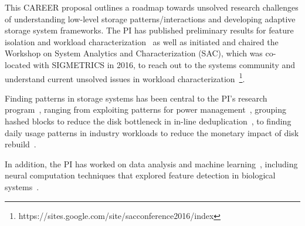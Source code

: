 This CAREER proposal outlines a roadmap towards unsolved research challenges of understanding low-level storage patterns/interactions and developing adaptive storage system frameworks.  The PI has published preliminary results for feature isolation and workload characterization~\cite{wildani2015case,TK_MASCOTSSNAP,TK_HOTSTORSNAP} as well as initiated and chaired the Workshop on System Analytics and Characterization (SAC), which was co-located with SIGMETRICS in 2016, to reach out to the systems community and understand current unsolved issues in workload characterization~\footnote{https://sites.google.com/site/sacconference2016/index}.     

Finding patterns in storage systems has been central to the PI's research program~\cite{avani-systor,TK_tos}, ranging from exploiting patterns for power management~\cite{avanipdsw}, grouping hashed blocks to reduce the disk bottleneck in in-line deduplication~\cite{hands}, to finding daily usage patterns in industry workloads to reduce the monetary impact of disk rebuild~\cite{perses}.   

%
In addition, the PI has worked on data analysis and machine learning~\cite{GAUL,TK_Env,TK_?,TK_tos,TK_thesis}, including neural computation techniques that explored feature detection in biological systems~\cite{TK_Tanya}.  

